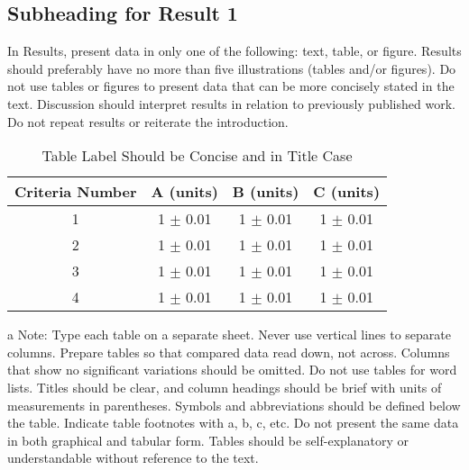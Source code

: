 \documentclass{strrespaper-journ}
\begin{document}
	    \subsection{Subheading for Result 1}
			In Results, present data in only one of the following: text, table, or figure.
			Results should preferably have no more than five illustrations (tables and/or figures).
			Do not use tables or figures to present data that can be more concisely stated in the text.
			Discussion should interpret results in relation to previously published work.
			Do not repeat results or reiterate the introduction.
	        \begin{table}[htbp]
	            \begin{threeparttable}
	                \caption{Table Label Should be Concise and in Title Case }
	                \label{tab:concise_table}
	                \begin{tabular}{cccc}
	                    \toprule
	                    Criteria Number & A (units)       & B (units)       & C (units)       \\
	                    \midrule
	                    1               & 1 \(\pm \) 0.01 & 1 \(\pm \) 0.01 & 1 \(\pm \) 0.01 \\
	                    2               & 1 \(\pm \) 0.01 & 1 \(\pm \) 0.01 & 1 \(\pm \) 0.01 \\
	                    3               & 1 \(\pm \) 0.01 & 1 \(\pm \) 0.01 & 1 \(\pm \) 0.01 \\
	                    4               & 1 \(\pm \) 0.01 & 1 \(\pm \) 0.01 & 1 \(\pm \) 0.01 \\
	                    \bottomrule
	                \end{tabular}
					\begin{tablenotes}
						\small
	                    \item[a] Note: Type each table on a separate sheet.
	                    Never use vertical lines to separate columns.
	                    Prepare tables so that compared data read down, not across.
	                    Columns that show no significant variations should be omitted.
	                    Do not use tables for word lists.
	                    Titles should be clear, and column headings should be brief with units of measurements in parentheses.
	                    Symbols and abbreviations should be defined below the table.
	                    Indicate table footnotes with a, b, c, etc.
	                    Do not present the same data in both graphical and tabular form.
	                    Tables should be self-explanatory or understandable without reference to the text.
	                \end{tablenotes}
	            \end{threeparttable}
	        \end{table}
\end{document}
